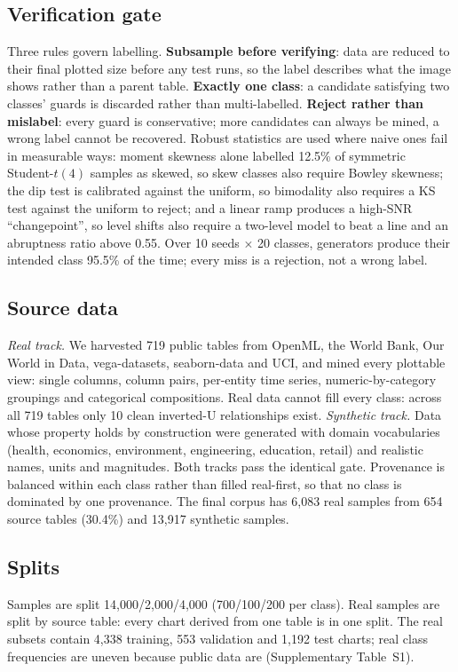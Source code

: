 \documentclass[11pt,a4paper]{article}
\begin{document}
\subsection*{Verification gate}
Three rules govern labelling. \textbf{Subsample before verifying}: data are reduced to
their final plotted size before any test runs, so the label describes what the image
shows rather than a parent table. \textbf{Exactly one class}: a candidate satisfying
two classes' guards is discarded rather than multi-labelled. \textbf{Reject rather
than mislabel}: every guard is conservative; more candidates can always be mined, a
wrong label cannot be recovered. Robust statistics are used where naive ones fail in
measurable ways: moment skewness alone labelled 12.5\% of symmetric Student-$t(4)$
samples as skewed, so skew classes also require Bowley skewness; the dip test is
calibrated against the uniform, so bimodality also requires a KS test against the
uniform to reject; and a linear ramp produces a high-SNR ``changepoint'', so level
shifts also require a two-level model to beat a line and an abruptness ratio above
0.55. Over 10 seeds $\times$ 20 classes, generators produce their intended class
95.5\% of the time; every miss is a rejection, not a wrong label.

\subsection*{Source data}
\emph{Real track.} We harvested 719 public tables from OpenML\cite{openml}, the World
Bank, Our World in Data, vega-datasets, seaborn-data and UCI, and mined every
plottable view: single columns, column pairs, per-entity time series,
numeric-by-category groupings and categorical compositions. Real data cannot fill
every class: across all 719 tables only 10 clean inverted-U relationships exist.
\emph{Synthetic track.} Data whose property holds by construction were generated with
domain vocabularies (health, economics, environment, engineering, education, retail)
and realistic names, units and magnitudes. Both tracks pass the identical gate.
Provenance is balanced within each class rather than filled real-first, so that no
class is dominated by one provenance. The final corpus has 6{,}083 real samples from
654 source tables (30.4\%) and 13{,}917 synthetic samples.

\subsection*{Splits}
Samples are split 14{,}000/2{,}000/4{,}000 (700/100/200 per class). Real samples are
split by source table: every chart derived from one table is in one split. The real
subsets contain 4{,}338 training, 553 validation and 1{,}192 test charts; real class
frequencies are uneven because public data are (Supplementary Table~S1).
\end{document}
